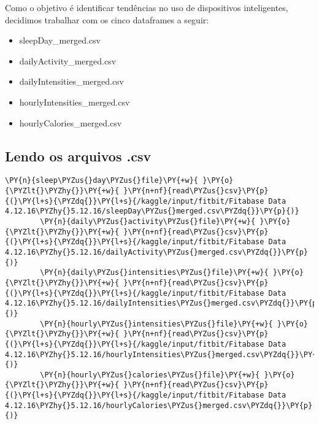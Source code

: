 Como o objetivo é identificar tendências no uso de dispositivos
inteligentes, decidimos trabalhar com os cinco dataframes a seguir:

\begin{itemize}
    \tightlist
    \item
          sleepDay\_merged.csv
    \item
          dailyActivity\_merged.csv
    \item
          dailyIntensities\_merged.csv
    \item
          hourlyIntensities\_merged.csv
    \item
          hourlyCalories\_merged.csv
\end{itemize}

\subsection{Lendo os arquivos .csv}

\begin{tcolorbox}[breakable, size=fbox, boxrule=1pt, pad at break*=1mm,colback=cellbackground, colframe=cellborder]
    \begin{Verbatim}[commandchars=\\\{\}]
        \PY{n}{sleep\PYZus{}day\PYZus{}file}\PY{+w}{ }\PY{o}{\PYZlt{}\PYZhy{}}\PY{+w}{ }\PY{n+nf}{read\PYZus{}csv}\PY{p}{(}\PY{l+s}{\PYZdq{}}\PY{l+s}{/kaggle/input/fitbit/Fitabase Data 4.12.16\PYZhy{}5.12.16/sleepDay\PYZus{}merged.csv\PYZdq{}}\PY{p}{)}
        \PY{n}{daily\PYZus{}activity\PYZus{}file}\PY{+w}{ }\PY{o}{\PYZlt{}\PYZhy{}}\PY{+w}{ }\PY{n+nf}{read\PYZus{}csv}\PY{p}{(}\PY{l+s}{\PYZdq{}}\PY{l+s}{/kaggle/input/fitbit/Fitabase Data 4.12.16\PYZhy{}5.12.16/dailyActivity\PYZus{}merged.csv\PYZdq{}}\PY{p}{)}
        \PY{n}{daily\PYZus{}intensities\PYZus{}file}\PY{+w}{ }\PY{o}{\PYZlt{}\PYZhy{}}\PY{+w}{ }\PY{n+nf}{read\PYZus{}csv}\PY{p}{(}\PY{l+s}{\PYZdq{}}\PY{l+s}{/kaggle/input/fitbit/Fitabase Data 4.12.16\PYZhy{}5.12.16/dailyIntensities\PYZus{}merged.csv\PYZdq{}}\PY{p}{)}
        \PY{n}{hourly\PYZus{}intensities\PYZus{}file}\PY{+w}{ }\PY{o}{\PYZlt{}\PYZhy{}}\PY{+w}{ }\PY{n+nf}{read\PYZus{}csv}\PY{p}{(}\PY{l+s}{\PYZdq{}}\PY{l+s}{/kaggle/input/fitbit/Fitabase Data 4.12.16\PYZhy{}5.12.16/hourlyIntensities\PYZus{}merged.csv\PYZdq{}}\PY{p}{)}
        \PY{n}{hourly\PYZus{}calories\PYZus{}file}\PY{+w}{ }\PY{o}{\PYZlt{}\PYZhy{}}\PY{+w}{ }\PY{n+nf}{read\PYZus{}csv}\PY{p}{(}\PY{l+s}{\PYZdq{}}\PY{l+s}{/kaggle/input/fitbit/Fitabase Data 4.12.16\PYZhy{}5.12.16/hourlyCalories\PYZus{}merged.csv\PYZdq{}}\PY{p}{)}
    \end{Verbatim}
\end{tcolorbox}

